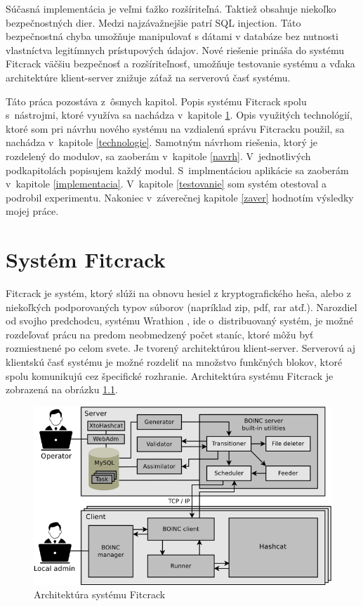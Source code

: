 \documentclass[slovak]{fitthesis}
\begin{document}
Súčasná implementácia je veľmi ťažko rozšíriteľná. Taktiež obsahuje niekoľko bezpečnostných dier. Medzi najzávažnejšie patrí SQL injection. Táto bezpečnostná chyba umožňuje manipulovať s dátami v databáze bez nutnosti vlastníctva legitímnych prístupových údajov. Nové riešenie prináša do systému Fitcrack väčšiu bezpečnosť a rozšíriteľnosť, umožňuje testovanie systému a vďaka architektúre klient-server znižuje záťaž na serverovú časť systému.

Táto práca pozostáva z~ôsmych kapitol. Popis systému Fitcrack spolu s~nástrojmi, ktoré využíva sa nachádza v~kapitole \ref{Fitcrack}. Opis využitých technológií, ktoré som pri návrhu nového systému na vzdialenú správu Fitcracku použil, sa nachádza v~kapitole \ref{technologie}. Samotným návrhom riešenia, ktorý je rozdelený do modulov, sa zaoberám v~kapitole \ref{navrh}. V~jednotlivých podkapitolách popisujem každý modul. S~implmentáciou aplikácie sa zaoberám v~kapitole \ref{implementacia}. V~kapitole \ref{testovanie} som systém otestoval a podrobil experimentu. Nakoniec v~záverečnej kapitole \ref{zaver} hodnotím výsledky mojej práce. 



\chapter{Systém Fitcrack}\label{Fitcrack}
Fitcrack je systém, ktorý slúži na obnovu hesiel z kryptografického heša, alebo z niekoľkých podporovaných typov súborov (napríklad zip, pdf, rar atď.). Narozdiel od svojho predchodcu, systému Wrathion \cite{wrathion}, ide o~distribuovaný systém, je možné rozdeľovať prácu na predom neobmedzený počet staníc, ktoré môžu byť rozmiestnené po celom svete. Je tvorený architektúrou klient-server. Serverovú aj klientskú časť systému je možné rozdeliť na množstvo funkčných blokov, ktoré spolu komunikujú cez špecifické rozhranie. Architektúra systému Fitcrack je zobrazená na obrázku \ref{fig:archFitcrackTrac}. 
\begin{figure}[H]
    \centering
    \includegraphics[scale=0.5]{obrazky/fitcrack_arch_web.png}
    \caption{Architektúra systému Fitcrack \cite{fitcrackSprava}}
    \label{fig:archFitcrackTrac}
\end{figure}
\end{document}
